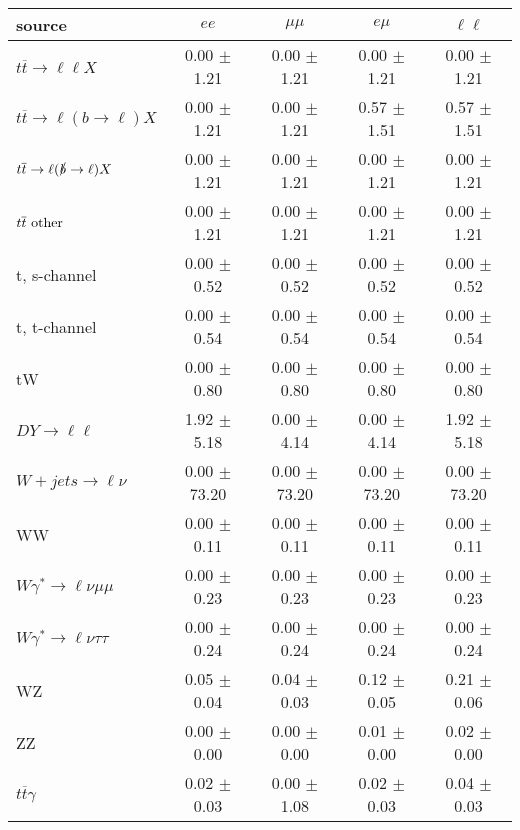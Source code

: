 \begin{tabular}{l|cccc} \hline\hline
source & $ee$ & $\mu\mu$ & $e\mu$ & $\ell\ell $ \\
\hline
$t\overline{t} \rightarrow \ell \ell X$ &  0.00 $\pm$  1.21 &  0.00 $\pm$  1.21 &  0.00 $\pm$  1.21 &  0.00 $\pm$  1.21 \\
$t\overline{t} \rightarrow \ell (b \rightarrow \ell) X$ &  0.00 $\pm$  1.21 &  0.00 $\pm$  1.21 &  0.57 $\pm$  1.51 &  0.57 $\pm$  1.51 \\
$t\overline{t} \rightarrow \ell (\slashed b \rightarrow \ell) X$ &  0.00 $\pm$  1.21 &  0.00 $\pm$  1.21 &  0.00 $\pm$  1.21 &  0.00 $\pm$  1.21 \\
        $t\overline{t}\ \rm{other}$ &  0.00 $\pm$  1.21 &  0.00 $\pm$  1.21 &  0.00 $\pm$  1.21 &  0.00 $\pm$  1.21 \\
\hline
                       t, s-channel &  0.00 $\pm$  0.52 &  0.00 $\pm$  0.52 &  0.00 $\pm$  0.52 &  0.00 $\pm$  0.52 \\
                       t, t-channel &  0.00 $\pm$  0.54 &  0.00 $\pm$  0.54 &  0.00 $\pm$  0.54 &  0.00 $\pm$  0.54 \\
                                 tW &  0.00 $\pm$  0.80 &  0.00 $\pm$  0.80 &  0.00 $\pm$  0.80 &  0.00 $\pm$  0.80 \\
\hline
         $DY \rightarrow \ell \ell$ &  1.92 $\pm$  5.18 &  0.00 $\pm$  4.14 &  0.00 $\pm$  4.14 &  1.92 $\pm$  5.18 \\
      $W+jets \rightarrow \ell \nu$ &  0.00 $\pm$ 73.20 &  0.00 $\pm$ 73.20 &  0.00 $\pm$ 73.20 &  0.00 $\pm$ 73.20 \\
                                 WW &  0.00 $\pm$  0.11 &  0.00 $\pm$  0.11 &  0.00 $\pm$  0.11 &  0.00 $\pm$  0.11 \\
\hline
$W\gamma^{*} \rightarrow \ell \nu \mu\mu$ &  0.00 $\pm$  0.23 &  0.00 $\pm$  0.23 &  0.00 $\pm$  0.23 &  0.00 $\pm$  0.23 \\
$W\gamma^{*} \rightarrow \ell \nu \tau\tau$ &  0.00 $\pm$  0.24 &  0.00 $\pm$  0.24 &  0.00 $\pm$  0.24 &  0.00 $\pm$  0.24 \\
                                 WZ &  0.05 $\pm$  0.04 &  0.04 $\pm$  0.03 &  0.12 $\pm$  0.05 &  0.21 $\pm$  0.06 \\
                                 ZZ &  0.00 $\pm$  0.00 &  0.00 $\pm$  0.00 &  0.01 $\pm$  0.00 &  0.02 $\pm$  0.00 \\
\hline
              $t\overline{t}\gamma$ &  0.02 $\pm$  0.03 &  0.00 $\pm$  1.08 &  0.02 $\pm$  0.03 &  0.04 $\pm$  0.03 \\

\end{tabular}
